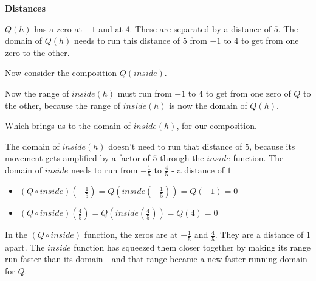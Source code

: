 \documentclass{ximera}
\begin{document}
\begin{observation} \textbf{\textcolor{-red!75}{Distances}}



$Q(h)$ has a zero at $-1$ and at $4$.  These are separated by a distance of $5$. The domain of $Q(h)$ needs to run this distance of $5$ from $-1$ to $4$ to get from one zero to the other.


Now consider the composition $Q(inside)$.

Now the range of $inside(h)$ must run from  $-1$ to $4$ to get from one zero of $Q$ to the other, because the range of $inside(h)$ is now the domain of $Q(h)$.

Which brings us to the domain of $inside(h)$, for our composition. 

The domain of $inside(h)$ doesn't need to run that distance of $5$, because its movement gets amplified by a factor of $5$ through the $inside$ function.  The domain of $inside$ needs to run from $-\frac{1}{5}$ to $\frac{4}{5}$ - a distance of $1$




\begin{itemize}
\item $(Q \circ inside)\left(-\frac{1}{5}\right) = Q\left(inside\left(-\frac{1}{5}\right)\right) = Q(-1) = 0$
\item $(Q \circ inside)\left(\frac{4}{5}\right) = Q\left(inside\left(\frac{4}{5}\right)\right) = Q(4) = 0$
\end{itemize}


In the $(Q \circ inside)$ function, the zeros are at $-\frac{1}{5}$ and $\frac{4}{5}$.  They are a distance of $1$ apart.  The $inside$ function has squeezed them closer together by making its range run faster than its domain - and that range became a new faster running domain for $Q$.




\end{observation}
\end{document}
